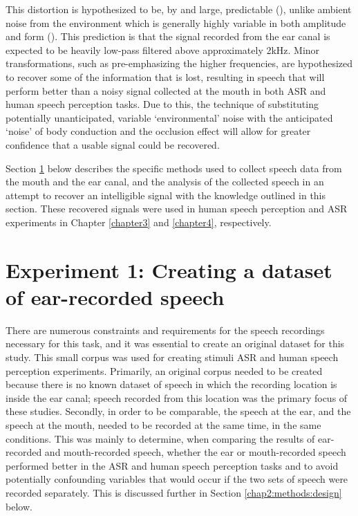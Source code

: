 This distortion is hypothesized to be, by and large, predictable (\DIFdelbegin {}\DIFdelend \DIFaddbegin {}\DIFaddend ), unlike ambient noise from the environment which is generally highly variable in both amplitude and form (\cite{zhang:17}). This prediction is that the signal recorded from the ear canal is expected to be heavily low-pass filtered above approximately 2kHz.  Minor transformations, such as pre-emphasizing the higher frequencies, are hypothesized to recover some of the information that is lost, resulting in speech that will perform better than a noisy signal collected at the mouth in both ASR and human speech perception tasks.
Due to this, the technique of substituting potentially unanticipated, variable `environmental' noise with the anticipated `noise' of body conduction and the occlusion effect will allow for greater confidence that a usable signal could be recovered.    

Section \ref{expt1} below describes the specific methods used to collect speech data from the mouth and the ear canal, and the analysis of the collected speech in an attempt to recover an intelligible signal with the knowledge outlined in this section.  These recovered signals were used in human speech perception and ASR experiments in Chapter \ref{chapter3} and \ref{chapter4}, respectively.


\section{Experiment 1: Creating a dataset of ear-recorded speech}\label{expt1}

There are numerous constraints and requirements for the speech recordings necessary for this task, and it was essential to create an original dataset for this study.  This small corpus was used for creating stimuli ASR and human speech perception experiments.  Primarily, an original corpus needed to be created because there is no known dataset of speech in which the recording location is inside the ear canal; speech recorded from this location was the primary focus of these studies.  Secondly, in order to be comparable, the speech at the ear, and the speech at the mouth, needed to be recorded at the same time, in the same conditions.  This was mainly to determine, when comparing the results of ear-recorded and mouth-recorded speech, whether the ear or mouth-recorded speech performed better in the ASR and human speech perception tasks and to avoid potentially confounding variables that would occur if the two sets of speech were recorded separately. This is discussed further in Section \ref{chap2:methods:design} below.

